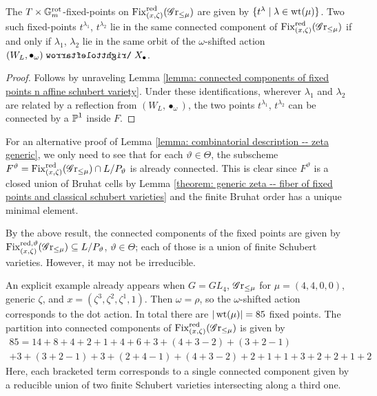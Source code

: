 \begin{lemma}\label{lemma: combinatorial description -- zeta generic}
The $T\times \Gm^{\rot}$-fixed-points on $\Fix^{\red}_{(x, \zeta)}(\Gr_{\leq \mu})$ are given by $\{ t^{\lambda} \mid \lambda \in \wt(\mu) \}$. Two such fixed-points $t^{\lambda_1}$, $t^{\lambda_2}$ lie in the same connected component of $\Fix^{\red}_{(x, \zeta)}(\Gr_{\leq \mu})$ if and only if $\lambda_1$, $\lambda_2$ lie in the same orbit of the $\omega$-shifted action $(W_L, \bullet_{\omega}) \acts X_{\bullet}$.    
\end{lemma}
\begin{proof}
Follows by unraveling Lemma \ref{lemma: connected components of fixed points n affine schubert variety}.
Under these identifications, wherever $\lambda_1$ and $\lambda_2$ are related by a reflection from $(W_L, \bullet_{\omega})$, the two points $t^{\lambda_1}$, $t^{\lambda_2}$ can be connected by a $\P^1$ inside $F$.
\end{proof}

\begin{remark}
For an alternative proof of Lemma \ref{lemma: combinatorial description -- zeta generic}, we only need to see that for each $\vartheta \in \Theta$, the subscheme $F^{\vartheta}= \Fix^{\red}_{(x, \zeta)}(\Gr_{\leq \mu}) \cap L/P_{\vartheta}$ is already connected. This is clear since $F^{\vartheta}$ is a closed union of Bruhat cells by Lemma \ref{theorem: generic zeta -- fiber of fixed points and classical schubert varieties} and the finite Bruhat order has a unique minimal element.
\end{remark}


\begin{remark}
By the above result, the connected components of the fixed points are given by $\Fix^{\red, \vartheta}_{(x, \zeta)}(\Gr_{\leq \mu}) \subseteq  L/P_{\vartheta}$, $\vartheta \in \Theta$; each of those is a union of finite Schubert varieties. However, it may not be irreducible. 

An explicit example already appears when $G= GL_4$, $\Gr_{\leq \mu}$ for $\mu = (4,4,0,0)$, generic $\zeta$, and $x = (\zeta^3, \zeta^2, \zeta^1, 1)$. Then $\omega = \rho$, so the $\omega$-shifted action corresponds to the dot action. In total there are $|\wt(\mu)| = 85$ fixed points. The partition into connected components of $\Fix^{\red}_{(x, \zeta)}(\Gr_{\leq \mu})$ is given by
\begin{multline*}
    85 
    = 14 + 8 + 4 + 2 + 1 + 4 
    + 6 + 3 + (4+3-2) + (3+2-1)\\
    + 3 + (3+2-1) +3 + (2+4-1)
    +(4+3-2) + 2 + 1 + 1
    + 3 + 2 + 2 + 1
    +2
\end{multline*}
Here, each bracketed term corresponds to a single connected component given by a reducible union of two finite Schubert varieties intersecting along a third one.
\end{remark}



